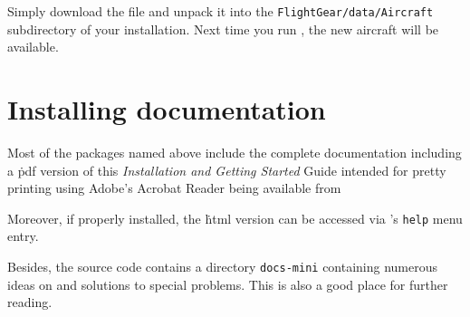 \medskip
{}
\medskip

Simply download the file and unpack it into the \texttt{FlightGear/data/Aircraft} subdirectory of your installation. Next time you run \FlightGear{}, the new aircraft will be available.

\section{Installing documentation}

Most of the packages named above include the complete \FlightGear{} documentation
including a \.pdf version of this \textit{Installation and Getting Started} Guide intended
for pretty printing using Adobe's Acrobat Reader being available from
 \medskip

 \medskip

 \noindent
 Moreover, if properly installed, the \.html version can be accessed via
\FlightGear{}'s \texttt{help} menu entry.

Besides, the source code contains a directory \texttt{docs-mini} containing numerous
ideas on and solutions to special problems. This is also a good place for further
reading.

